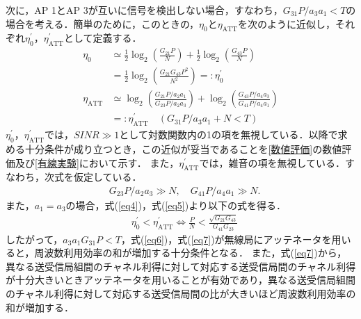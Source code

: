 \documentclass[master]{kuisthesis}		%
\begin{document}
次に，AP 1とAP 3が互いに信号を検出しない場合，すなわち，$G_{31} P/a_3 a_1 < T$の場合を考える．簡単のために，このときの，$\eta_0$と$\eta_\mathrm{ATT}$を次のように近似し，それぞれ$\eta_0^\prime$，$\eta_\mathrm{ATT}^\prime$として定義する．
\begin{align}
\eta_0 &\simeq  \frac{1}{2} \log_2\left(\frac{G_{21} P}{N}\right)
+ \frac{1}{2} \log_2\left(\frac{G_{43} P}{N}\right) \nonumber \\
& =  \frac{1}{2} \log_2\left(\frac{G_{21} G_{43}P^2}{N^2}\right) =: \eta_0^\prime \label{eq4} \\
\eta_\mathrm{ATT} &\simeq  \displaystyle \log_2\left(\frac{G_{21} P/a_2 a_1}{G_{23} P/a_2 a_3}\right) + \log_2\left(\frac{G_{43} P/a_4 a_3}{G_{41} P/a_4 a_1}\right) \nonumber \\
&  =: \eta_\mathrm{ATT}^\prime \quad (G_{31} P/a_3 a_1 + N < T) \label{eq5}
\end{align}
$\eta_0^\prime$，$\eta_\mathrm{ATT}^\prime$では，$\mathit{SINR}\gg1$として対数関数内の1の項を無視している．以降で求める十分条件が成り立つとき，この近似が妥当であることを\ref{数値評価}の数値評価及び\ref{有線実験}において示す．
また，$\eta_\mathrm{ATT}^\prime$では，雑音の項を無視している．すなわち，次式を仮定している．
\begin{align}
&G_{23} P/a_2 a_3 \gg N, \quad G_{41} P/a_4 a_1 \gg N. \label{eq6}
\end{align}
また，$a_1 = a_3$の場合，式(\ref{eq4})，式(\ref{eq5})より以下の式を得る．
\begin{align}
&\eta_0^\prime<\eta_\mathrm{ATT}^\prime \Leftrightarrow \frac{P}{N} < \frac{\sqrt{G_{21}G_{43}}}{G_{41}G_{23}} \label{eq7}
\end{align}
したがって，$a_3 a_1 G_{31} P < T$，式(\ref{eq6})，式(\ref{eq7})が無線局にアッテネータを用いると，周波数利用効率の和が増加する十分条件となる．
また，式(\ref{eq7})から，異なる送受信局組間のチャネル利得に対して対応する送受信局間のチャネル利得が十分大きいときアッテネータを用いることが有効であり，異なる送受信局組間のチャネル利得に対して対応する送受信局間の比が大きいほど周波数利用効率の和が増加する．
\end{document}
